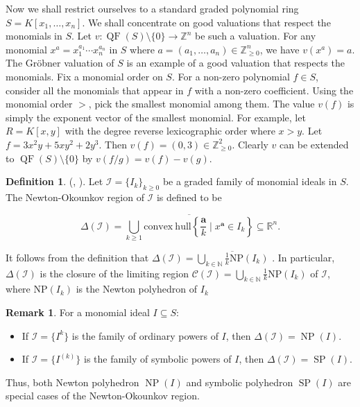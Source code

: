 \documentclass[11pt,reqno,a4paper]{amsart}
\theoremstyle{definition}
\newtheorem{remark}[theorem]{Remark}
\newtheorem{definition}[theorem]{Definition}
\begin{document}
Now we shall restrict ourselves to a standard graded polynomial ring $S = K[x_1,\ldots,x_n]$. We shall concentrate on good valuations that respect the monomials in $S$. Let $v: \operatorname{QF}(S) \setminus \{0\} \to \mathbb{Z}^n$ be such a valuation. For any monomial $x^a = x_1^{a_1}\cdots x_n^{a_n}$ in $S$ where $a = (a_1,\ldots,a_n) \in \mathbb{Z}_{\geq 0}^n$, we have $v(x^a) = a$. The Gr\"obner valuation of $S$ is an example of a good valuation that respects the monomials. Fix a monomial order on $S$. For a non-zero polynomial $f \in S$, consider all the monomials that appear in $f$ with a non-zero coefficient. Using the monomial order $>$, pick the smallest monomial among them. The value $v(f)$ is simply the exponent vector of the smallest monomial. For example, let $R = K[x,y]$ with the degree reverse lexicographic order where $x > y$. Let $f = 3x^2y + 5xy^2 + 2y^3$. Then $v(f) = (0,3) \in \mathbb{Z}_{\geq 0}^2$. Clearly $v$ can be extended to $\operatorname{QF}(S) \setminus \{0\}$ by $v(f/g) = v(f) - v(g)$.



\begin{definition} 

(\cite [Section 2]{HaNguyenNguyen25}, \cite[Section 4]{KavehKhovanskii14}). Let \(\mathcal{I} = \{I_k\}_{k\geq  0}\) be a graded family of monomial ideals in \(S\). The Newton-Okounkov region of \(\mathcal{I}\) is defined to be

\[
\Delta (\mathcal{I}) = \overline {\bigcup_{k\geq 1}\mathrm{convex~hull}\left\{\frac{\mathbf{a}}{k}\mid x^{\mathbf{a}}\in I_k\right\}} \subseteq \mathbb{R}^n.
\]

\end{definition}

It follows from the definition that \(\Delta (\mathcal{I}) =\overline {\bigcup_{k\in \mathbb{N}}\frac{1}{k}\mathrm{NP}(I_k)}\) . In particular, \(\Delta (\mathcal{I})\) is the closure of the limiting region \(\mathcal{C}(\mathcal{I}) = \bigcup_{k\in \mathbb{N}}\frac{1}{k}\mathrm{NP}(I_k)\) of \(\mathcal{I}\), where        \(\mathrm{NP}(I_k)\) is the Newton polyhedron of $I_k$


\begin{remark}
    For a monomial ideal \(I \subseteq S\):
    \begin{itemize}
        \item If \(\mathcal{I} = \{I^k\}\) is the family of ordinary powers of \(I\),  then \(\Delta(\mathcal{I}) = \operatorname{NP}(I)\).
        \item If \(\mathcal{I} = \{I^{(k)}\}\) is the family of symbolic powers of \(I\), then \(\Delta(\mathcal{I}) = \operatorname{SP}(I)\).
    \end{itemize}
    Thus, both Newton polyhedron $\operatorname{NP}(I)$ and symbolic polyhedron $\operatorname{SP}(I)$ are special cases of the Newton-Okounkov region.
\end{remark}
\end{document}
